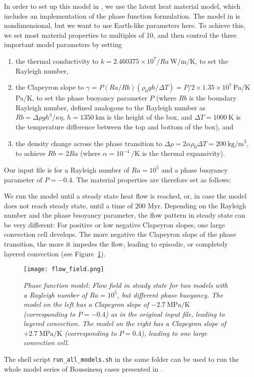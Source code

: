 In order to set up this model in \aspect{}, we use the latent heat material model, which includes an implementation of the phase function formulation. 
The model in \cite{CY85} is nondimensional, but we want to use Earth-like parameters here. To achieve this, we set most material properties to multiples of 10, and then control the three important model parameters by setting
\begin{enumerate}
  \item the thermal conductivity to $k = 2.460375 \times 10^7 / Ra~\si{\watt\per\metre\per\kelvin}$, to set the Rayleigh number,
  \item the Clapeyron slope to $\gamma = P (Ra/Rb) (\rho_0 g h/\Delta T) = P/2 \times 1.35 \times 10^7~\si{\pascal\per\kelvin}$ Pa/K, to set the phase buoyancy parameter $P$ (where $Rb$ is the boundary Rayleigh number, defined analogous to the Rayleigh number as $Rb = \Delta \rho g h^3 / \kappa \eta$, $h=1350~\si{\km}$ is the height of the box, and $\Delta T = 1000~\si{\kelvin}$ is the temperature difference between the top and bottom of the box), and 
  \item the density change across the phase transition to $\Delta \rho = 2 \alpha \rho_0 \Delta T = 200~\si{\kg\per\cubic\meter}$, to achieve $Rb$ = 2$Ra$ (where $\alpha = 10^{-4}~\si{\per\kelvin}$ is the thermal expansivity). 
\end{enumerate}   

Our input file is for a Rayleigh number of $Ra = 10^5$ and a phase buoyancy parameter of $P=-0.4$.                                  
The material properties are therefore set as follows:



We run the model until a steady state heat flow is reached, or, in case the model does not reach steady state, until a time of 200 Myr. 
Depending on the Rayleigh number and the phase buoyancy parameter, the flow pattern in steady state can be very different: For positive or low negative Clapeyron slopes, one large convection cell develops. The more negative the Clapeyron slope of the phase transition, the more it impedes the flow, leading to episodic, or completely layered convection (see Figure~\ref{fig:christensen_yuen}). 

\begin{figure}
\centering
\texttt{[image: flow\_field.png]}
\caption{\it Phase function model: Flow field in steady state for two models with a Rayleigh number of $Ra = 10^5$, but different phase buoyancy. The model on the left has a Clapeyron slope of $-2.7~\si{\mega\pascal\per\kelvin}$ (corresponding to $P=-0.4$) as in the original input file, leading to layered convection. The model on the right has a Clapeyron slope of $+2.7~\si{\mega\pascal\per\kelvin}$ (corresponding to $P=0.4$), leading to one large convection cell.}
\label{fig:christensen_yuen}
\end{figure}

The shell script \texttt{run\_all\_models.sh} in the same folder can be used to run the whole model series of Boussinesq cases presented in \cite{CY85}.  
